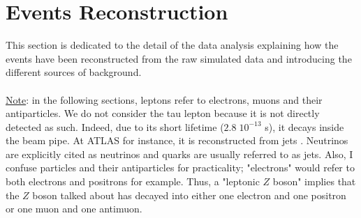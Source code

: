 \documentclass[a4paper,11pt]{article}
\begin{document}
	\section{Events Reconstruction} \label{EventsReconstruction}
    This section is dedicated to the detail of the data analysis explaining how the events have been reconstructed from the raw simulated data and introducing the different sources of background.\\\\
    \underline{Note}: in the following sections, leptons refer to electrons, muons and their antiparticles. We do not consider the tau lepton because it is not directly detected as such. Indeed, due to its short lifetime ($2.8\;10^{-13}$ s), it decays inside the beam pipe. At ATLAS for instance, it is reconstructed from jets \cite{Friedrich_2012}. Neutrinos are explicitly cited as neutrinos and quarks are usually referred to as jets. Also, I confuse particles and their antiparticles for practicality; "electrons" would refer to both electrons and positrons for example. Thus, a "leptonic $Z$ boson" implies that the $Z$ boson talked about has decayed into either one electron and one positron or one muon and one antimuon.
    
\end{document}
